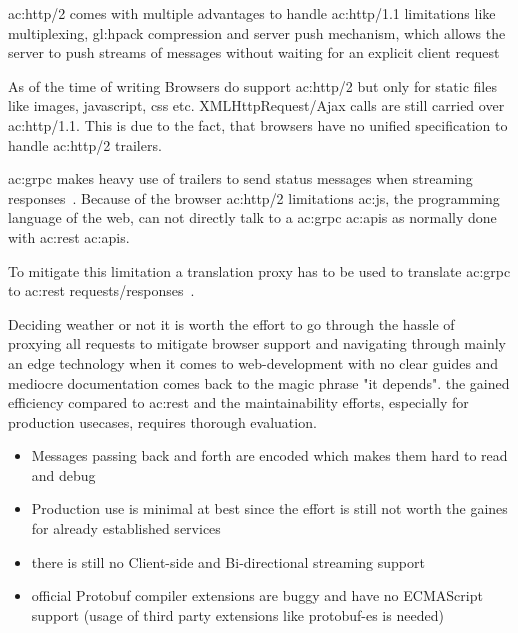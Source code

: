 \gls{ac:http}/2 comes with multiple advantages to handle \gls{ac:http}/1.1 limitations like multiplexing, \gls{gl:hpack} compression and server push mechanism, which allows the server to push streams of messages without waiting for an explicit client request~\citep{RFC7540}

As of the time of writing Browsers do support \gls{ac:http}/2 but only for static files like images, javascript, css etc. XMLHttpRequest/Ajax calls are still carried over \gls{ac:http}/1.1. This is due to the fact, that browsers have no unified specification to handle \gls{ac:http}/2 trailers.


\gls{ac:grpc} makes heavy use of trailers to send status messages when streaming responses~\citep{grpcspec}. Because of the browser \gls{ac:http}/2 limitations \gls{ac:js}, the programming language of the web, can not directly talk to a \gls{ac:grpc} \glspl{ac:api} as normally done with \gls{ac:rest} \glspl{ac:api}. 

To mitigate this limitation a translation proxy has to be used to translate \gls{ac:grpc} to \gls{ac:rest} requests/responses~\citep{grpcBrowserState}.



Deciding weather or not it is worth the effort to go through the hassle of proxying all requests to mitigate browser support and navigating through mainly an edge technology when it comes to web-development with no clear guides and mediocre documentation comes back to the magic phrase "it depends". the gained efficiency compared to \gls{ac:rest} and the maintainability efforts, especially for production usecases, requires thorough evaluation.

\begin{itemize}
  \item Messages passing back and forth are encoded which makes them hard to read and debug
  \item Production use is minimal at best since the effort is still not worth the gaines for already established services
  \item there is still no Client-side and Bi-directional streaming support
  \item official Protobuf compiler extensions are buggy and have no ECMAScript support (usage of third party extensions like protobuf-es is needed)
\end{itemize}

